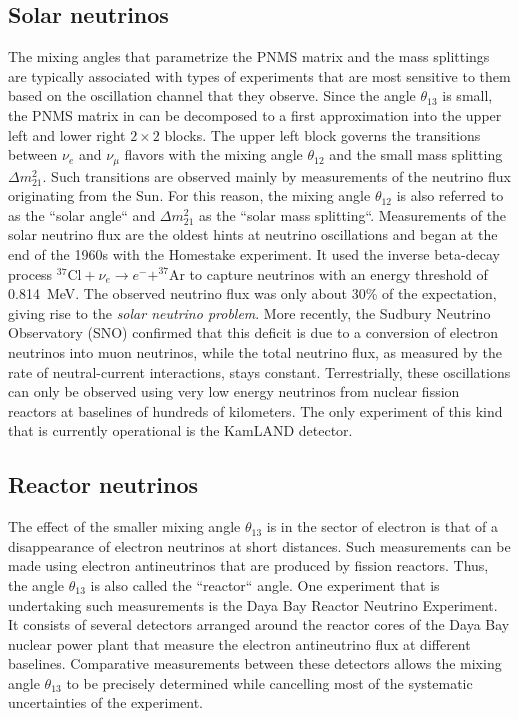 \subsection{Solar neutrinos}
The mixing angles that parametrize the PNMS matrix and the mass splittings are typically associated with types of experiments that are most sensitive to them based on the oscillation channel that they observe. Since the angle $\theta_{13}$ is small, the PNMS matrix in  can be decomposed to a first approximation into the upper left and lower right $2\times2$ blocks. The upper left block governs the transitions between $\nu_e$ and $\nu_\mu$ flavors with the mixing angle $\theta_{12}$ and the small mass splitting $\Delta m^2_{21}$. Such transitions are observed mainly by measurements of the neutrino flux originating from the Sun. For this reason, the mixing angle $\theta_{12}$ is also referred to as the ``solar angle`` and $\Delta m^2_{21}$ as the ``solar mass splitting``. Measurements of the solar neutrino flux are the oldest hints at neutrino oscillations and began at the end of the 1960s with the Homestake\cite{DAVIS199413} experiment. It used the inverse beta-decay process $^{37}\mathrm{Cl}+\nu_e \rightarrow e^- + ^{37}\mathrm{Ar}$ to capture neutrinos with an energy threshold of \SI{0.814}{MeV}. The observed neutrino flux was only about 30\% of the expectation, giving rise to the \emph{solar neutrino problem}. More recently, the Sudbury Neutrino Observatory (SNO) confirmed\cite{PhysRevC.88.025501} that this deficit is due to a conversion of electron neutrinos into muon neutrinos, while the total neutrino flux, as measured by the rate of neutral-current interactions, stays constant. Terrestrially, these oscillations can only be observed using very low energy neutrinos from nuclear fission reactors at baselines of hundreds of kilometers. The only experiment of this kind that is currently operational is the KamLAND detector\cite{PhysRevLett.90.021802}.

\subsection{Reactor neutrinos}
The effect of the smaller mixing angle $\theta_{13}$ is in the sector of electron is that of a disappearance of electron neutrinos at short distances. Such measurements can be made using electron antineutrinos that are produced by fission reactors. Thus, the angle $\theta_{13}$ is also called the ``reactor`` angle. One experiment that is undertaking such measurements is the Daya Bay Reactor Neutrino Experiment\cite{DayaBay:2007fgu}. It consists of several detectors arranged around the reactor cores of the Daya Bay nuclear power plant that measure the electron antineutrino flux at different baselines. Comparative measurements between these detectors allows the mixing angle $\theta_{13}$ to be precisely determined while cancelling most of the systematic uncertainties of the experiment.

